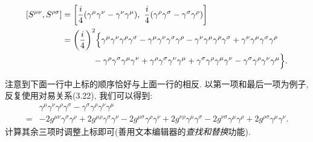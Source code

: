 \documentclass[10pt,b5paper,openany]{book}
\begin{document}
\begin{equation}
  \begin{aligned}
    \relax
    [S^{\mu\nu}, S^{\rho\sigma}] &= \biggl[\frac{i}{4}(\gamma^\mu \gamma^\nu - \gamma^\nu \gamma^\mu), \ \frac{i}{4}(\gamma^\rho \gamma^\sigma - \gamma^\sigma \gamma^\rho)\biggr]\\
    &= \biggl(\frac{i}{4}\biggr)^2 \Bigl\{\gamma^\mu \gamma^\nu \gamma^\rho \gamma^\sigma - \gamma^\mu \gamma^\nu \gamma^\sigma \gamma^\rho - \gamma^\nu \gamma^\mu \gamma^\rho \gamma^\sigma + \gamma^\nu \gamma^\mu \gamma^\sigma \gamma^\rho \\ 
    &\qquad \quad \ \ - \gamma^\rho \gamma^\sigma \gamma^\mu \gamma^\nu + \gamma^\rho \gamma^\sigma \gamma^\nu \gamma^\mu + \gamma^\sigma \gamma^\rho \gamma^\mu \gamma^\nu - \gamma^\sigma \gamma^\rho \gamma^\nu \gamma^\mu \Bigr\}. 
  \end{aligned}
\end{equation}

注意到下面一行中上标的顺序恰好与上面一行的相反. 以第一项和最后一项为例子, 反复使用对易关系(3.22), 我们可以得到: 
\begin{equation}
  \begin{aligned}
    &\gamma^\mu \gamma^\nu \gamma^\rho \gamma^\sigma - \gamma^\sigma \gamma^\rho \gamma^\nu \gamma^\mu \\
    = &- 2g^{\mu\nu}\gamma^\sigma \gamma^\rho + 2g^{\mu\rho}\gamma^\sigma \gamma^\nu - 2g^{\mu\sigma}\gamma^\rho \gamma^\nu + 2g^{\nu\rho}\gamma^\mu \gamma^\sigma - 2g^{\nu\sigma}\gamma^\mu \gamma^\rho + 2g^{\rho\sigma}\gamma^\mu \gamma^\nu. 
  \end{aligned}
\end{equation}
计算其余三项时调整上标即可(善用文本编辑器的\textit{查找和替换}功能). 
\end{document}
